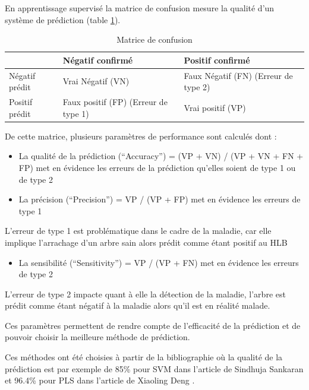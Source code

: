 \documentclass[
  11pt,
  french,
  a4paper,
  extrafontsizes,onecolumn,openright
  ]{memoir}
\providecommand{\tightlist}{%
  \setlength{\itemsep}{0pt}\setlength{\parskip}{0pt}}
\begin{document}
En apprentissage supervisé la matrice de confusion mesure la qualité d'un système de prédiction (table \ref{tab:MC}).

\scriptsize

\begin{longtable}[t]{lll}
\caption{\label{tab:MC}Matrice de confusion}\\
\toprule
  & Négatif confirmé & Positif confirmé\\
\midrule
Négatif prédit & Vrai Négatif (VN) & Faux Négatif (FN) (Erreur de type 2)\\
Positif prédit & Faux positif (FP) (Erreur de type 1) & Vrai positif (VP)\\
\bottomrule
\end{longtable}

\normalsize

De cette matrice, plusieurs paramètres de performance sont calculés dont :

\begin{itemize}
\item
  La qualité de la prédiction (``Accuracy'') = (VP + VN) / (VP + VN + FN + FP) met en évidence les erreurs de la prédiction qu'elles soient de type 1 ou de type 2
\item
  La précision (``Precision'') = VP / (VP + FP) met en évidence les erreurs de type 1
\end{itemize}

L'erreur de type 1 est problématique dans le cadre de la maladie, car elle implique l'arrachage d'un arbre sain alors prédit comme étant positif au HLB

\begin{itemize}
\tightlist
\item
  La sensibilité (``Sensitivity'') = VP / (VP + FN) met en évidence les erreurs de type 2
\end{itemize}

L'erreur de type 2 impacte quant à elle la détection de la maladie, l'arbre est prédit comme étant négatif à la maladie alors qu'il est en réalité malade.

Ces paramètres permettent de rendre compte de l'efficacité de la prédiction et de pouvoir choisir la meilleure méthode de prédiction.

Ces méthodes ont été choisies à partir de la bibliographie où la qualité de la prédiction est par exemple de 85\% pour SVM dans l'article de Sindhuja Sankaran \autocite{sankaran_huanglongbing_2013} et 96.4\% pour PLS dans l'article de Xiaoling Deng \autocite{deng_detection_2020}.
\end{document}
